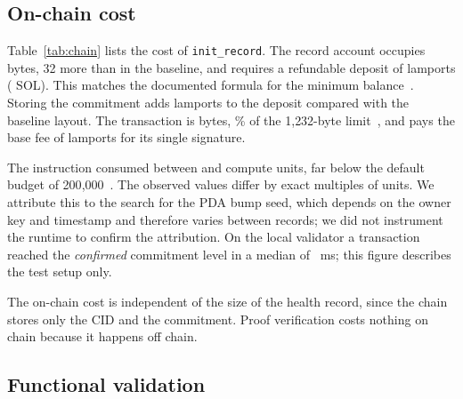 \subsection{On-chain cost}

\begin{table}[t]
\centering
\caption{On-chain cost of creating one record (local test validator).}
\label{tab:chain}
\tablefont

\end{table}

Table~\ref{tab:chain} lists the cost of \texttt{init\_record}. The record
account occupies \AccountBytes{} bytes, 32 more than in the baseline, and
requires a refundable deposit of \RentLamports{} lamports (\RentSol{} SOL).
This matches the documented formula for the minimum
balance~\cite{solana-accounts}. Storing the commitment adds
\RentIncreaseLamports{} lamports to the deposit compared with the baseline
layout. The transaction is \TxBytes{} bytes, \TxPercentOfLimit\% of the
1{,}232-byte limit~\cite{solana-transactions}, and pays the base fee of
\FeeLamports{} lamports for its single signature.

The instruction consumed between \CuMin{} and \CuMax{} compute units, far
below the default budget of 200{,}000~\cite{solana-fees}. The observed values
differ by exact multiples of \CuStep{} units. We attribute this to the search
for the PDA bump seed, which depends on the owner key and timestamp and
therefore varies between records; we did not instrument the runtime to
confirm the attribution. On the local validator a transaction reached the
\emph{confirmed} commitment level in a median of \LocalConfirmMs~ms; this
figure describes the test setup only.

The on-chain cost is independent of the size of the health record, since the
chain stores only the CID and the commitment. Proof verification costs
nothing on chain because it happens off chain.

\subsection{Functional validation}

